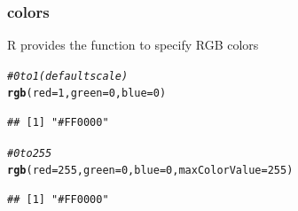 \documentclass[12pt]{beamer}\usepackage[]{graphicx}\usepackage[]{color}
\makeatletter
\newcommand{\hlnum}[1]{\textcolor[rgb]{0.686,0.059,0.569}{#1}}%
\newcommand{\hlcom}[1]{\textcolor[rgb]{0.678,0.584,0.686}{\textit{#1}}}%
\newcommand{\hlstd}[1]{\textcolor[rgb]{0.345,0.345,0.345}{#1}}%
\newcommand{\hlkwc}[1]{\textcolor[rgb]{0.333,0.667,0.333}{#1}}%
\newcommand{\hlkwd}[1]{\textcolor[rgb]{0.737,0.353,0.396}{\textbf{#1}}}%
\newenvironment{kframe}{%
 \def\at@end@of@kframe{}%
 \ifinner\ifhmode%
  \def\at@end@of@kframe{\end{minipage}}%
  \begin{minipage}{\columnwidth}%
 \fi\fi%
 \def\FrameCommand##1{\hskip\@totalleftmargin \hskip-\fboxsep
 \colorbox{shadecolor}{##1}\hskip-\fboxsep
     \hskip-\linewidth \hskip-\@totalleftmargin \hskip\columnwidth}%
 \MakeFramed {\advance\hsize-\width
   \@totalleftmargin\z@ \linewidth\hsize
   \@setminipage}}%
 {\par\unskip\endMakeFramed%
 \at@end@of@kframe}
\newenvironment{knitrout}{}{} %
\makeatother
\begin{document}

\begin{frame}[fragile]
\frametitle{ colors}

R provides the function {\hilit {}} to specify RGB colors
\begin{knitrout}\footnotesize
{}\color{fgcolor}\begin{kframe}
\begin{alltt}
\hlcom{# 0 to 1 (default scale)}
\hlkwd{rgb}\hlstd{(}\hlkwc{red} \hlstd{=} \hlnum{1}\hlstd{,} \hlkwc{green} \hlstd{=} \hlnum{0}\hlstd{,} \hlkwc{blue} \hlstd{=} \hlnum{0}\hlstd{)}
\end{alltt}
\begin{verbatim}
## [1] "#FF0000"
\end{verbatim}
\begin{alltt}
\hlcom{# 0 to 255}
\hlkwd{rgb}\hlstd{(}\hlkwc{red} \hlstd{=} \hlnum{255}\hlstd{,} \hlkwc{green} \hlstd{=} \hlnum{0}\hlstd{,} \hlkwc{blue} \hlstd{=} \hlnum{0}\hlstd{,} \hlkwc{maxColorValue} \hlstd{=} \hlnum{255}\hlstd{)}
\end{alltt}
\begin{verbatim}
## [1] "#FF0000"
\end{verbatim}
\end{kframe}
\end{knitrout}

\end{frame}

\end{document}
